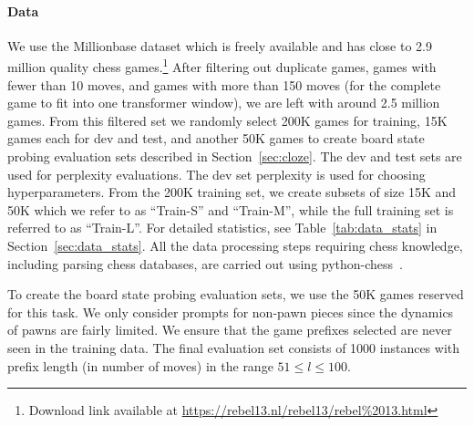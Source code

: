 \documentclass[12pt]{thesis-umich}[thesis]
\begin{document}
\paragraph{Data}
We use the Millionbase dataset which is freely available and has close to 2.9 million quality chess games.\footnote{Download link available at \url{https://rebel13.nl/rebel13/rebel\%2013.html}}
After filtering out duplicate games, games with
fewer than 10 moves, and games with
more than 150 moves (for the complete game to fit into one transformer window), we are left with around 2.5 million games.
From this filtered set we randomly select 200K games for training, 15K games each for dev and test, and another 50K games to create board state probing evaluation sets described in Section~\ref{sec:cloze}.
The dev and test sets are used for perplexity evaluations. 
The dev set perplexity is used for choosing hyperparameters.
From the 200K training set, we create subsets of size 15K and 50K which we refer to as ``Train-S'' and ``Train-M'', while the full training set is referred to as ``Train-L''.
For detailed statistics, see Table~\ref{tab:data_stats} in Section~\ref{sec:data_stats}.
All the data processing steps requiring chess knowledge, including parsing chess databases, are carried out using python-chess~\citep{python-chess}.

To create the board state probing evaluation sets, we use the 50K games reserved for this task. We only consider prompts for non-pawn pieces since the dynamics of pawns are fairly limited.
We ensure that the game prefixes selected are never seen in the training data.
The final evaluation set consists of 1000 instances with prefix length (in number of moves) in the range $51 \le l \le 100$.
\end{document}

